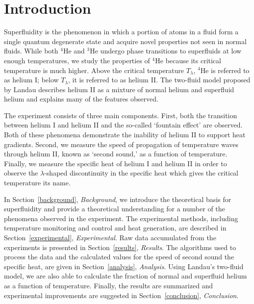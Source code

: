 
\section{Introduction}\label{introduction}

Superfluidity is the phenomenon in which a portion of atoms in a fluid form a single quantum degenerate state and acquire novel properties not seen in normal fluids. While both $^{4}$He and $^{3}$He undergo phase transitions to superfluids at low enough temperatures, we study the properties of $^{4}$He because its critical temperature is much higher. Above the critical temperature $T_{\lambda}$, $^{4}$He is referred to as helium I; below $T_{\lambda}$, it is referred to as helium II. The two-fluid model proposed by Landau \cite{landau} describes helium II as a mixture of normal helium and superfluid helium and explains many of the features observed.

The experiment consists of three main components. First, both the transition between helium I and helium II and the so-called `fountain effect' are observed. Both of these phenomena demonstrate the inability of helium II to support heat gradients. Second, we measure the speed of propagation of temperature waves  through helium II, known as `second sound,'  as a function of temperature. Finally, we measure the specific heat of helium I and helium II in order to observe the $\lambda$-shaped discontinuity in the specific heat which gives the critical temperature its name.

In Section~\ref{background}, \emph{Background}, we introduce the theoretical basis for superfluidity and provide a theoretical understanding for a number of the phenomena observed in the experiment. The experimental methods, including temperature monitoring and control and heat generation, are described in Section~\ref{experimental}, \emph{Experimental}. Raw data accumulated from the experiments is presented in Section~\ref{results}, \emph{Results}. The algorithms used to process the data and the calculated values for the speed of second sound the specific heat, are given in Section~\ref{analysis}, \emph{Analysis}. Using Landau's two-fluid model, we are also able to calculate the fraction of normal and superfluid helium as a function of temperature. Finally, the results are summarized and experimental improvements are suggested in Section~\ref{conclusion}, \emph{Conclusion}.